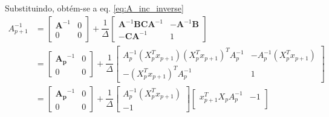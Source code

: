 Substituindo, obtém-se a eq. \ref{eq:A_inc_inverse}
\smallskip
\begin{equation}
    \begin{split}A_{p+1}^{-1} &= 
        \begin{bmatrix} 
            \mathbf{A}^{-1} & 0 \\ 
            0 & 0 
        \end{bmatrix} + \dfrac{1}{\Delta}
        \begin{bmatrix} 
            \mathbf{A}^{-1}\mathbf{B}\mathbf{CA}^{-1} & -\mathbf{A}^{-1}\mathbf{B} \\ 
            -\mathbf{CA}^{-1} & 1 
        \end{bmatrix} \\
        &= 
        \begin{bmatrix} 
            \mathbf{A_p}^{-1} & 0 \\ 
            0 & 0 
        \end{bmatrix} + \dfrac{1}{\Delta}
        \begin{bmatrix} 
            A_p^{-1} (X_p^T x_{p+1})  (X_p^T x_{p+1})^T A_p^{-1} & - A_p^{-1} (X_p^T x_{p+1}) \\ 
            - (X_p^T x_{p+1})^T A_p^{-1} & 1 
        \end{bmatrix} \\
        &= 
        \begin{bmatrix} 
            \mathbf{A_p}^{-1} & 0 \\ 
            0 & 0 
        \end{bmatrix} + \dfrac{1}{\Delta}
        \begin{bmatrix} 
            A_p^{-1} (X_p^T x_{p+1}) \\ 
            -1 
        \end{bmatrix}
        \begin{bmatrix} 
            x_{p+1}^T X_p A_p^{-1}& -1\\             
        \end{bmatrix} \\
    \end{split}
    \label{eq:A_inc_inverse}
\end{equation}

